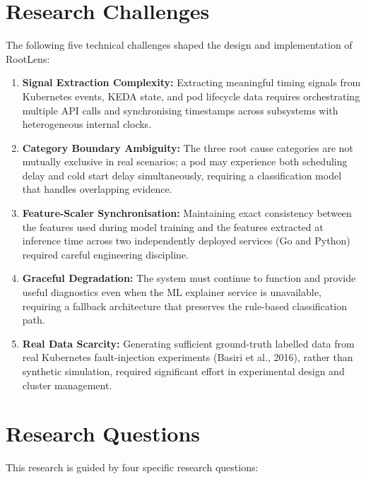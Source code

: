 \section{Research Challenges}
The following five technical challenges shaped the design and implementation of RootLens:

\begin{enumerate}
    \item \textbf{Signal Extraction Complexity:} Extracting meaningful timing signals from Kubernetes events, KEDA state, and pod lifecycle data requires orchestrating multiple API calls and synchronising timestamps across subsystems with heterogeneous internal clocks.
    \item \textbf{Category Boundary Ambiguity:} The three root cause categories are not mutually exclusive in real scenarios; a pod may experience both scheduling delay and cold start delay simultaneously, requiring a classification model that handles overlapping evidence.
    \item \textbf{Feature-Scaler Synchronisation:} Maintaining exact consistency between the features used during model training and the features extracted at inference time across two independently deployed services (Go and Python) required careful engineering discipline.
    \item \textbf{Graceful Degradation:} The system must continue to function and provide useful diagnostics even when the ML explainer service is unavailable, requiring a fallback architecture that preserves the rule-based classification path.
    \item \textbf{Real Data Scarcity:} Generating sufficient ground-truth labelled data from real Kubernetes fault-injection experiments (Basiri et al., 2016), rather than synthetic simulation, required significant effort in experimental design and cluster management.
\end{enumerate}

\section{Research Questions}
This research is guided by four specific research questions:

